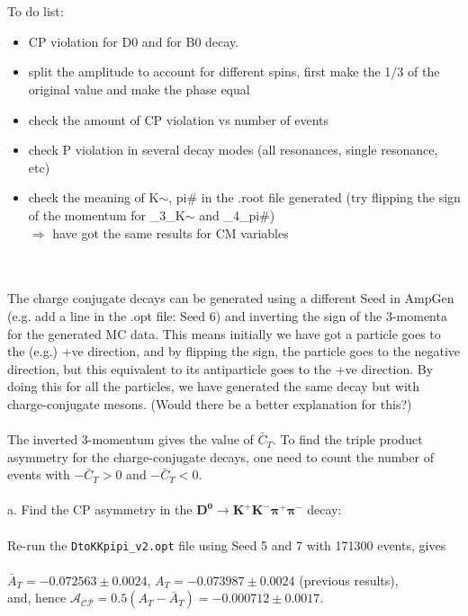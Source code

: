 \\
\\
To do list:
\begin{itemize}
    \item CP violation for D0 and for B0 decay.
    \item split the amplitude to account for different spins, first make the 1/3 of the original value and make the phase equal
    \item check the amount of CP violation vs number of events
    \item check P violation in several decay modes (all resonances, single resonance, etc)
    \item check the meaning of K$\sim$, pi\# in the .root file generated (try flipping the sign of the momentum for \_3\_K$\sim$ and \_4\_pi\#) 
    \\
    \indent $\Rightarrow$ have got the same results for CM variables
\end{itemize}
\\
\\
The charge conjugate decays can be generated using a different Seed in AmpGen (e.g. add a line in the .opt file: Seed 6) and inverting the sign of the 3-momenta for the generated MC data. This means initially we have got a particle goes to the (e.g.) +ve direction, and by flipping the sign, the particle goes to the negative direction, but this equivalent to its antiparticle goes to the +ve direction. By doing this for all the particles, we have generated the same decay but with charge-conjugate mesons. (Would there be a better explanation for this?) 
\\
\\
The inverted 3-momentum gives the value of $\bar{C}_T$. To find the triple product asymmetry for the charge-conjugate decays, one need to count the number of events with $-\bar{C}_T>0$ and $-\bar{C}_T<0$.
\\
\\
a. Find the CP asymmetry in the $\bm{D^0\to K^+K^-\pi^+\pi^-}$ decay:
\\
\\
Re-run the \texttt{DtoKKpipi\_v2.opt} file using Seed 5 and 7 with 171300 events, gives
\\
\\
\indent $\bar{A}_T = -0.072563\pm0.0024$, $A_T=-0.073987\pm 0.0024$ (previous results),
\\
\indent and, hence $\mathcal{A}_{\mathcal{C}\mathcal{P}} = 0.5 (A_T-\bar{A}_T)= -0.000712 \pm 0.0017$.
\\
